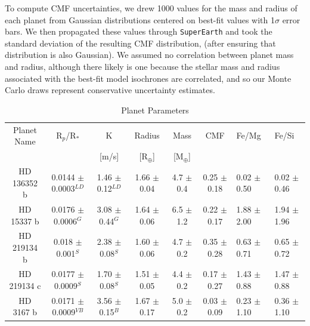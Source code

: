 \documentclass[twocolumn]{aastex631}
\begin{document}
To compute CMF uncertainties, we drew 1000 values for the mass and radius of each planet from Gaussian distributions centered on best-fit values with 1$\sigma$ error bars. We then propagated these values through \texttt{SuperEarth} and took the standard deviation of the resulting CMF distribution, (after ensuring that distribution is also Gaussian). We assumed no correlation between planet mass and radius, although there likely is one because the stellar mass and radius associated with the best-fit model isochrones are correlated, and so our Monte Carlo draws represent conservative uncertainty estimates. 


\begin{table}
\begin{centering}
\caption{Planet Parameters}
\begin{tabular}{|c|c|c|c|c|c|h|h|} \hline
 Planet Name &  R$_{p}$/R$_{*}$          & K                     & Radius            & Mass             &  CMF              & Fe/Mg           & Fe/Si        \\  
             &                           & [m/s]                 & [R$_{\oplus}$]    & [M$_{\oplus}$]   &                   &                 &                                   \\  \hline
HD 136352 b  & 0.0144 $\pm$ 0.0003$^{LD}$& 1.46 $\pm$ 0.12$^{LD}$& 1.66 $\pm$ 0.04  & 4.7 $\pm$ 0.4     & 0.25 $\pm$ 0.18   & 0.02 $\pm$ 0.50  & 0.02 $\pm$ 0.46  \\  
HD 15337 b   & 0.0176 $\pm$ 0.0006$^{G}$ & 3.08 $\pm$ 0.44$^{G}$ & 1.64  $\pm$ 0.06 & 6.5 $\pm$ 1.2     & 0.22  $\pm$ 0.17  & 1.88 $\pm$ 2.00 & 1.94 $\pm$ 1.96  \\  
HD 219134 b  & 0.018 $\pm$ 0.001$^{S}$   & 2.38 $\pm$ 0.08$^{S}$ & 1.60 $\pm$ 0.06  & 4.7  $\pm$ 0.2    &  0.35 $\pm$ 0.28  & 0.63 $\pm$ 0.71 & 0.65 $\pm$ 0.72  \\ 
HD 219134 c  & 0.0177 $\pm$ 0.0009$^{S}$ & 1.70 $\pm$ 0.08$^{S}$ & 1.51 $\pm$ 0.05  & 4.4 $\pm$ 0.2     &  0.17 $\pm$ 0.27  & 1.43 $\pm $0.88 & 1.47 $\pm$ 0.88  \\ 
HD 3167 b    & 0.0171 $\pm$ 0.0009$^{VB}$& 3.56 $\pm$ 0.15$^{B}$ & 1.67  $\pm$ 0.17 & 5.0 $\pm$ 0.2     &  0.03 $\pm$ 0.09  & 0.23 $\pm$ 1.10 & 0.36 $\pm$ 1.10  \\ 

\end{tabular}
\end{centering}
\end{table}
\end{document}
